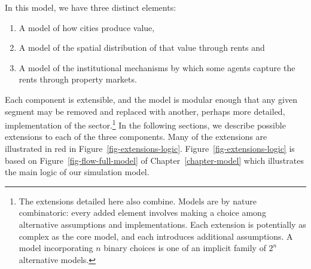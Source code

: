In this model, we have three distinct elements: 
\begin{enumerate}
    \item A model of how cities produce value,
    \item A model of the spatial distribution of that value through rents and 
    \item A model of the institutional mechanisms by which some agents capture the rents through property markets. %
\end{enumerate}Each component is extensible, %
and the model is modular enough that any given segment may be removed and replaced with another, perhaps more detailed, implementation of the sector.\footnote{The extensions detailed here also combine. Models are by nature combinatoric: every added element involves making a choice among alternative assumptions and implementations. Each extension is potentially as complex as the core model, and each introduces additional assumptions. A model incorporating $n$ binary choices is one of an implicit family of $2^n$ alternative models.} 
In the following sections, we describe possible extensions to each of the three components. %
Many of the extensions are illustrated in red in Figure~\ref{fig-extensions-logic}. Figure~\ref{fig-extensions-logic} is based on Figure~\ref{fig-flow-full-model} of Chapter~\ref{chapter-model} which illustrates the main logic of our simulation model. 



